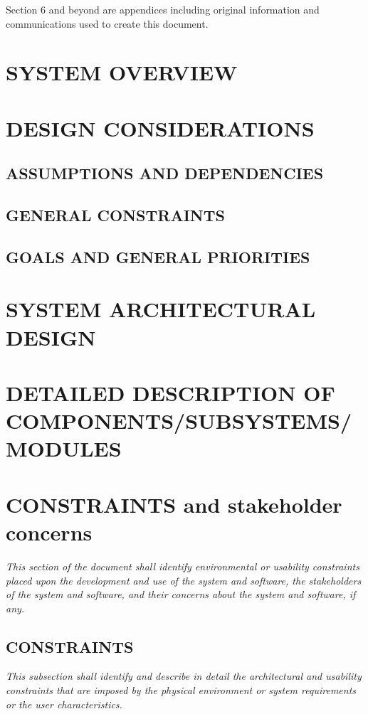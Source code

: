 \documentclass[twoside,letterpaper]{article}
\begin{document}
\smallskip

\noindent
Section 6 and beyond are appendices including original information and
communications used to create this document.

\clearpage\pagestyle{Standard}
\section{SYSTEM OVERVIEW}

\clearpage\pagestyle{Standard}
\section{DESIGN CONSIDERATIONS}
\subsection{ASSUMPTIONS AND DEPENDENCIES}
\subsection{GENERAL CONSTRAINTS}
\subsection{GOALS AND GENERAL PRIORITIES}

\clearpage\pagestyle{Standard}
\section{SYSTEM ARCHITECTURAL DESIGN}

\clearpage\pagestyle{Standard}
\section{DETAILED DESCRIPTION OF COMPONENTS/SUBSYSTEMS/MODULES}

\clearpage\pagestyle{Standard}
\section{CONSTRAINTS and stakeholder concerns}

{\itshape\color{black}
This section of the document shall identify environmental or usability
constraints placed upon the development and use of the system and
software, the stakeholders of the system and software, and their
concerns about the system and software, if any.}

\subsection{CONSTRAINTS}
{\itshape\color{black}
This subsection shall identify and describe in detail the architectural
and usability constraints that are imposed by the physical environment
or system requirements or the user characteristics.}
\end{document}
